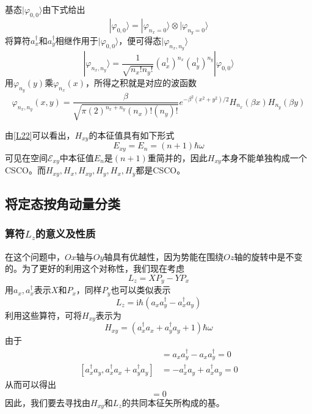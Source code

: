 \documentclass[]{article}
\begin{document}
基态$|\varphi_{0,0}\rangle$由下式给出
\begin{equation}
	|\varphi_{0,0}\rangle=|\varphi_{n_x=0}\rangle\otimes|\varphi_{n_y=0}\rangle
\end{equation}
将算符$a_x^\dagger$和$a_y^\dagger$相继作用于$|\varphi_{0,0}\rangle$，便可得态$|\varphi_{n_x,n_y}\rangle$
\begin{equation}
	|\varphi_{n_x,n_y}\rangle=\dfrac{1}{\sqrt{n_x!n_y!}}(a_x^\dagger)^{n_x}(a_y^\dagger)^{n_y}|\varphi_{0,0}\rangle
\end{equation}
用$\varphi_{n_y}(y)$乘$\varphi_{n_x}(x)$，所得之积就是对应的波函数
\begin{equation}
	\varphi_{n_x,n_y}(x,y)=\dfrac{\beta}{\sqrt{\pi(2)^{n_x+n_y}(n_x)!(n_y)!}}e^{-\beta^2(x^2+y^2)/2}H_{n_x}(\beta x)H_{n_y}(\beta y)
\end{equation}

由\eqref{L22}可以看出，$H_{xy}$的本征值具有如下形式
\begin{equation}
	E_{xy}=E_n=(n+1)\hbar\omega
\end{equation}
可见在空间$\mathscr{E}_{xy}$中本征值$E_n$是$(n+1)$重简并的，因此$H_{xy}$本身不能单独构成一个CSCO。而${H_{xy},H_x},{H_{xy},H_y},{H_x,H_y}$都是CSCO。
\subsection{将定态按角动量分类}
\subsubsection{算符$L_z$的意义及性质}
在这个问题中，$Ox$轴与$Oy$轴具有优越性，因为势能在围绕$Oz$轴的旋转中是不变的。为了更好的利用这个对称性，我们现在考虑
\begin{equation}
	L_z=XP_y-YP_x
\end{equation}
用$a_x,a_x^\dagger$表示$X$和$P_x$，同样$P_y$也可以类似表示
\begin{equation}
	L_z=\mathrm{i}\hbar(a_xa_y^\dagger-a_x^\dagger a_y)
	\label{L36}
\end{equation}
利用这些算符，可将$H_{xy}$表示为
\begin{equation}
	H_{xy}=(a_x^\dagger a_x+a_y^\dagger a_y+1)\hbar\omega
\end{equation}
由于
\begin{align}
	[a_xa_y^\dagger,a_x^\dagger a_x+a_y^\dagger a_y]&=a_xa_y^\dagger-a_xa_y^\dagger=0\nonumber\\
	[a_x^\dagger a_y,a_x^\dagger a_x+a_y^\dagger a_y]&=-a_x^\dagger a_y+a_x^\dagger a_y=0
\end{align}
从而可以得出
\begin{equation}
	[H_{xy},L_z]=0
\end{equation}
因此，我们要去寻找由$H_{xy}$和$L_z$的共同本征矢所构成的基。
\end{document}
